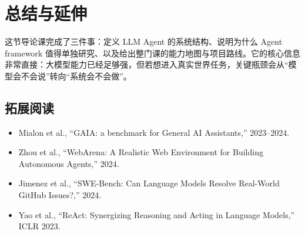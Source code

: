 \section{总结与延伸}

这节导论课完成了三件事：定义 LLM Agent 的系统结构、说明为什么 Agent framework 值得单独研究、以及给出整门课的能力地图与项目路线。它的核心信息非常直接：大模型能力已经足够强，但若想进入真实世界任务，关键瓶颈会从``模型会不会说''转向``系统会不会做''。

\subsection{拓展阅读}

\begin{itemize}
    \item Mialon et al., ``GAIA: a benchmark for General AI Assistants,'' 2023--2024.
    \item Zhou et al., ``WebArena: A Realistic Web Environment for Building Autonomous Agents,'' 2024.
    \item Jimenez et al., ``SWE-Bench: Can Language Models Resolve Real-World GitHub Issues?,'' 2024.
    \item Yao et al., ``ReAct: Synergizing Reasoning and Acting in Language Models,'' ICLR 2023.
\end{itemize}



